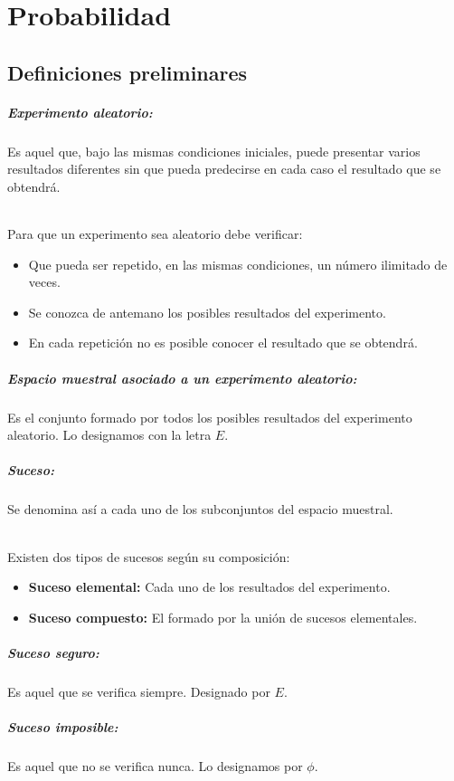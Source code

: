 \chapter{Probabilidad}
\section{Definiciones preliminares}
\paragraph{Experimento aleatorio:}
Es aquel que, bajo las mismas condiciones iniciales, puede presentar varios resultados diferentes sin que pueda predecirse en cada caso el resultado que se obtendrá.
\subparagraph{}
Para que un experimento sea aleatorio debe verificar:
\begin{itemize}
\item Que pueda ser repetido, en las mismas condiciones, un número ilimitado de veces.
\item Se conozca de antemano los posibles resultados del experimento.
\item En cada repetición no es posible conocer el resultado que se obtendrá.
\end{itemize}
\paragraph{Espacio muestral asociado a un experimento aleatorio:}
Es el conjunto formado por todos los posibles resultados del experimento aleatorio. Lo designamos con la letra $E$.
\paragraph{Suceso:} Se denomina así a cada uno de los subconjuntos del espacio muestral.
\subparagraph{}
Existen dos tipos de sucesos según su composición:
\begin{itemize}
\item \textbf{Suceso elemental:} Cada uno de los resultados del experimento.
\item \textbf{Suceso compuesto:} El formado por la unión de sucesos elementales.
\end{itemize}
\paragraph{Suceso seguro:}
Es aquel que se verifica siempre. Designado por $E$.
\paragraph{Suceso imposible:}
Es aquel que no se verifica nunca. Lo designamos por $\phi$.

